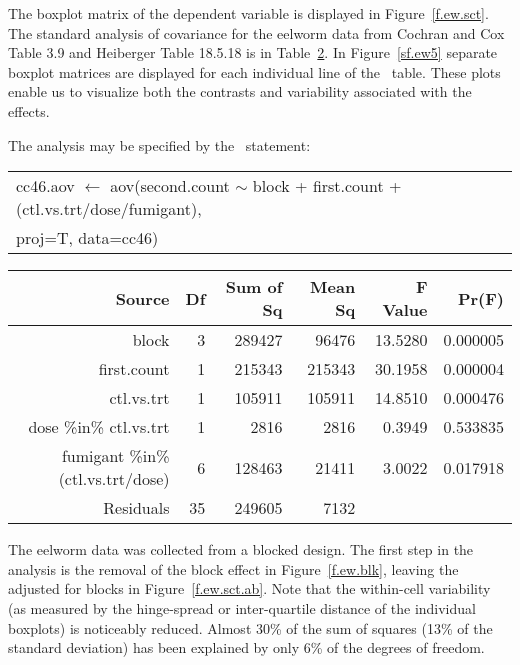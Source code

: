 The boxplot matrix of the dependent variable  is
displayed in Figure~\ref{f.ew.sct}.
The standard analysis of covariance for the eelworm data from
Cochran and Cox
Table 3.9 and Heiberger Table 18.5.18 is in Table~\ref{t.ew.sum.bt}.  In
Figure~\ref{sf.ew5}
separate boxplot matrices are displayed for each individual line
of the \ANOVA\ table.  These plots enable us to visualize both
the contrasts and variability associated with the effects.

\begin{table}[tbp]
 \label{t.ew.sum.bt}
The analysis may be specified by the \iS\ statement:
\begin{center}
\small\sf
\begin{tabular}{l}
cc46.aov $\leftarrow$ aov(second.count $\sim$
block + first.count + (ctl.vs.trt/dose/fumigant), \\
\quad proj=T, data=cc46)
\end{tabular}
\end{center}

\begin{center}
\small\sf
\begin{tabular}{rrrrrr}
\hline
			    Source&Df&Sum of Sq&Mean Sq&F Value&    Pr(F)\\
\hline
			     block& 3&	 289427&  96476&13.5280&0.000005 \\
		       first.count& 1&	 215343& 215343&30.1958&0.000004 \\
			ctl.vs.trt& 1&	 105911& 105911&14.8510&0.000476 \\
	    dose \%in\% ctl.vs.trt& 1&	   2816&   2816& 0.3949&0.533835 \\
 fumigant \%in\% (ctl.vs.trt/dose)& 6&	 128463&  21411& 3.0022&0.017918 \\
			 Residuals&35&	 249605&   7132&       &	 \\
\hline
\end{tabular}
\end{center}
\end{table}

The eelworm data was collected from a blocked design.  The first
step in the analysis is the removal of the block effect in
Figure~\ref{f.ew.blk}, leaving the  adjusted for blocks
in Figure~\ref{f.ew.sct.ab}.  Note that
the within-cell variability (as measured by the hinge-spread or
inter-quartile distance of the individual boxplots) is noticeably
reduced.  Almost 30\% of the sum of squares (13\% of the standard deviation)
has been explained by only 6\% of the degrees of freedom.

